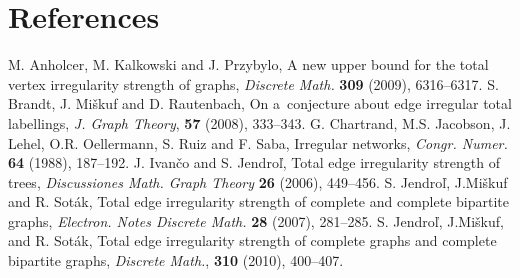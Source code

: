 \documentclass[12pt]{elsarticle}
\newtheorem*{theorem A}{Theorem A}
\newtheorem*{theorem B}{N\"olker's Theorem}
\theoremstyle{remark}
\theoremstyle{remark}
\begin{document}
\section*{References} 
\begin{thebibliography}{99}
 M. Anholcer, M. Kalkowski and J. Przybylo, A new upper bound for the total vertex irregularity strength of graphs, \textit{Discrete Math.} \textbf{309} (2009), 6316--6317.
 S. Brandt, J. Mi\v{s}kuf and D. Rautenbach, On a~conjecture about edge irregular total labellings, {\it J. Graph Theory}, \textbf{57} (2008), 333--343.
 G. Chartrand, M.S. Jacobson, J. Lehel, O.R. Oellermann, S. Ruiz and F. Saba, Irregular networks, \textit{Congr. Numer.} \textbf{64} (1988), 187--192.
 J. Ivan\v{c}o and S. Jendro\v{l}, Total edge irregularity strength of trees, {\it Discussiones Math. Graph Theory}  {\bf 26} (2006), 449--456.
 S. Jendro\v{l}, J.Mi\v{s}kuf and R. Sot\'{a}k, Total edge irregularity strength of complete and complete bipartite graphs, {\it Electron. Notes Discrete Math.}  {\bf 28} (2007), 281--285.
 S. Jendro\v{l}, J.Mi\v{s}kuf, and R. Sot\'{a}k, Total edge irregularity strength of complete graphs and complete bipartite graphs, {\it Discrete Math.}, {\bf 310} (2010), 400--407.
\end{thebibliography}
\end{document}
